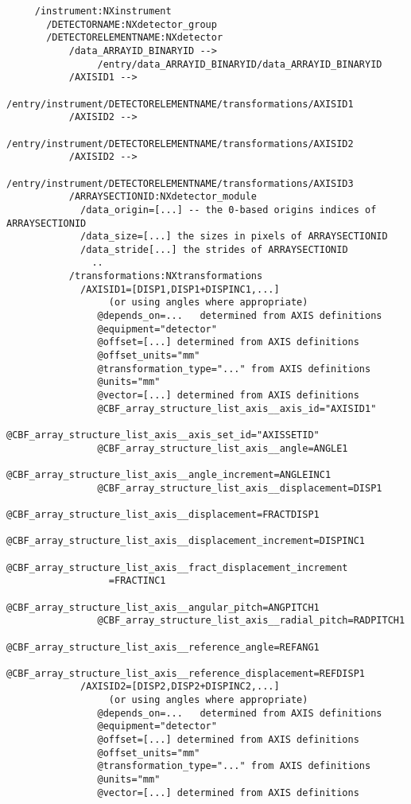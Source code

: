 \documentclass[11pt]{article}
\begin{document}
{\begin{verbatim}
     /instrument:NXinstrument
       /DETECTORNAME:NXdetector_group
       /DETECTORELEMENTNAME:NXdetector
           /data_ARRAYID_BINARYID -->
                /entry/data_ARRAYID_BINARYID/data_ARRAYID_BINARYID
           /AXISID1 -->
                /entry/instrument/DETECTORELEMENTNAME/transformations/AXISID1
           /AXISID2 -->
                /entry/instrument/DETECTORELEMENTNAME/transformations/AXISID2
           /AXISID2 -->
                /entry/instrument/DETECTORELEMENTNAME/transformations/AXISID3
           /ARRAYSECTIONID:NXdetector_module
             /data_origin=[...] -- the 0-based origins indices of ARRAYSECTIONID
             /data_size=[...] the sizes in pixels of ARRAYSECTIONID
             /data_stride[...] the strides of ARRAYSECTIONID
               ..
           /transformations:NXtransformations
             /AXISID1=[DISP1,DISP1+DISPINC1,...]
                  (or using angles where appropriate)
                @depends_on=...   determined from AXIS definitions
                @equipment="detector"
                @offset=[...] determined from AXIS definitions
                @offset_units="mm"
                @transformation_type="..." from AXIS definitions
                @units="mm"
                @vector=[...] determined from AXIS definitions
                @CBF_array_structure_list_axis__axis_id="AXISID1"
                @CBF_array_structure_list_axis__axis_set_id="AXISSETID"
                @CBF_array_structure_list_axis__angle=ANGLE1
                @CBF_array_structure_list_axis__angle_increment=ANGLEINC1
                @CBF_array_structure_list_axis__displacement=DISP1
                @CBF_array_structure_list_axis__displacement=FRACTDISP1
                @CBF_array_structure_list_axis__displacement_increment=DISPINC1
                @CBF_array_structure_list_axis__fract_displacement_increment
                  =FRACTINC1
                @CBF_array_structure_list_axis__angular_pitch=ANGPITCH1
                @CBF_array_structure_list_axis__radial_pitch=RADPITCH1
                @CBF_array_structure_list_axis__reference_angle=REFANG1
                @CBF_array_structure_list_axis__reference_displacement=REFDISP1
             /AXISID2=[DISP2,DISP2+DISPINC2,...]
                  (or using angles where appropriate)
                @depends_on=...   determined from AXIS definitions
                @equipment="detector"
                @offset=[...] determined from AXIS definitions
                @offset_units="mm"
                @transformation_type="..." from AXIS definitions
                @units="mm"
                @vector=[...] determined from AXIS definitions

\end{verbatim}}
\end{document}
